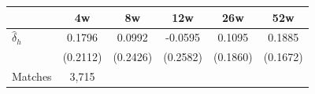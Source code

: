 \begin{tabular}{l*{5}{c}}
\toprule
 & 4w & 8w & 12w & 26w & 52w \\
\midrule
$\hat{\delta}_h$ & 0.1796 & 0.0992 & -0.0595 & 0.1095 & 0.1885 \\
 & (0.2112) & (0.2426) & (0.2582) & (0.1860) & (0.1672) \\
\midrule
Matches & 3,715 \\
\bottomrule
\end{tabular}
